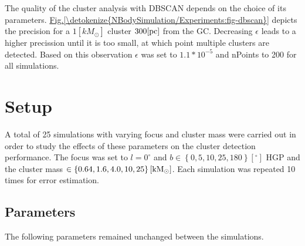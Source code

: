\documentclass[letterpaper,10pt,english]{sphinxmanual}
\begin{document}
\sphinxAtStartPar
The quality of the cluster analysis with DBSCAN depends on the choice of its parameters.
\hyperref[\detokenize{NBodySimulation/Experiments:fig-dbscan}]{Fig.\@ \ref{\detokenize{NBodySimulation/Experiments:fig-dbscan}}} depicts the precision for a \(1 [kM_\odot]\) cluster \(300 \textup{[pc]}\) from the GC.
Decreasing \(\epsilon\) leads to a higher precission until it is too small, at which point multiple clusters are detected.
Based on this observation \(\epsilon\) was set to \(1.1*10^{-5}\) and nPoints to 200 for all simulations.


\section{Setup}
\label{\detokenize{NBodySimulation/Experiments:setup}}
\sphinxAtStartPar
A total of 25 simulations with varying focus and cluster mass were carried out in order to study the effects of these parameters on the cluster detection performance.
The focus was set to \(l=0^{\circ}\) and \(b \in \left \{0,5,10,25,180 \right \}[^\circ]\) HGP and the cluster mass \(\in \left \{0.64, 1.6, 4.0, 10, 25 \right \} [\textup{kM}_\odot]\).
Each simulation was repeated 10 times for error estimation.


\subsection{Parameters}
\label{\detokenize{NBodySimulation/Experiments:parameters}}\label{\detokenize{NBodySimulation/Experiments:parameters-label}}
\sphinxAtStartPar
The following parameters remained unchanged between the simulations.
\end{document}
